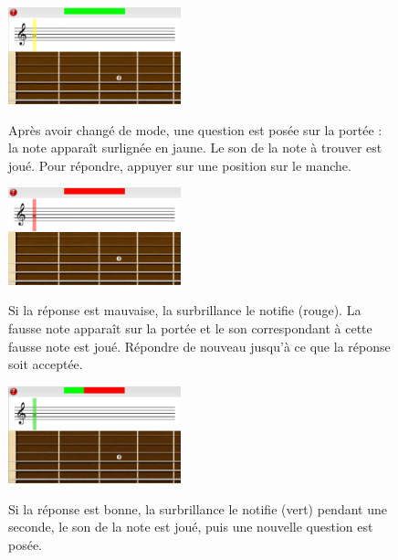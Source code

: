 \documentclass{scrreprt}
\begin{document}
\begin{figure}[!ht]
  \begin{minipage}{6cm}
      \includegraphics[width=5cm]{images/portee_first_question.png}
  \end{minipage}\hfill
  \begin{minipage}{10cm}
  {Après avoir changé de mode, une question est posée sur la portée : la note apparaît surlignée en jaune. Le son de la note à trouver est joué. Pour répondre, appuyer sur une position sur le manche.}
   \end{minipage}
\end{figure}


\begin{figure}[!ht]
  \begin{minipage}{6cm}
      \includegraphics[width=5cm]{images/portee_first_bad_question.png}

  \end{minipage}\hfill
  \begin{minipage}{10cm}
  {Si la réponse est mauvaise, la surbrillance le notifie (rouge). La fausse note apparaît sur la portée et le son correspondant à cette fausse note est joué. Répondre de nouveau jusqu'à ce que la réponse soit acceptée.}
   \end{minipage}
\end{figure}


\begin{figure}[!ht]
  \begin{minipage}{6cm}
      \includegraphics[width=5cm]{images/portee_first_good_question.png}
  \end{minipage}\hfill
  \begin{minipage}{10cm}
  {Si la réponse est bonne, la surbrillance le notifie (vert) pendant une seconde, le son de la note est joué, puis une nouvelle question est posée.}
   \end{minipage}
\end{figure}
\end{document}
